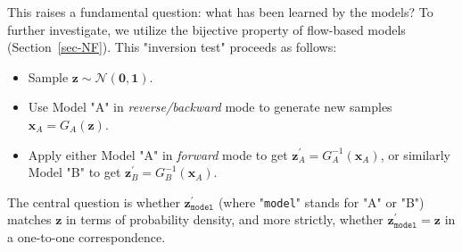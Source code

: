 \documentclass[fleqn,usenatbib]{mnras}
\begin{document}
This raises a fundamental question: what has been learned by the models?
To further investigate, we utilize the bijective property of flow-based models (Section~\ref{sec-NF}). This "inversion test" proceeds as follows:
\begin{itemize}
    \item Sample $\bm{z} \sim \mathcal{N}(\bm{0}, \bm{1})$.
    \item Use Model "A" in \textit{reverse/backward} mode to generate new samples $\bm{x}_A = G_A(\bm{z})$.
    \item Apply either Model "A" in \textit{forward} mode to get $\bm{z}_A^\prime = G_A^{-1}(\bm{x}_A)$, or similarly Model "B" to get $\bm{z}_B^\prime = G_B^{-1}(\bm{x}_A)$.
\end{itemize}
The central question is whether $\bm{z}_{\texttt{model}}^\prime$ (where "\texttt{model}" stands for "A" or "B") matches $\bm{z}$ in terms of probability density, and more strictly, whether $\bm{z}_{\texttt{model}}^\prime = \bm{z}$ in a one-to-one correspondence.
\end{document}
